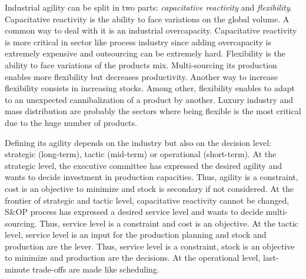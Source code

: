 Industrial agility can be split in two parts: \emph{capacitative reactivity} and \emph{flexibility}.
Capacitative reactivity is the ability to face variations on the global volume.
A common way to deal with it is an industrial overcapacity.
Capacitative reactivity is more critical in sector like process industry since adding overcapacity is extremely expensive and outsourcing can be extremely hard.
Flexibility is the ability to face variations of the products mix.
Multi-sourcing its production  enables more flexibility but decreases productivity.
Another way to increase flexibility consists in increasing stocks.
Among other, flexibility enables to adapt to an unexpected cannibalization of a product by another.
Luxury industry and mass distribution are probably the sectors where being flexible is the most critical due to the huge number of products.


Defining its agility depends on the industry but also on the decision level: strategic (long-term), tactic (mid-term) or operational (short-term).
At the strategic level, the executive committee has expressed the desired agility and wants to decide investment in production capacities.
Thus, agility is a constraint, cost is an objective to minimize and stock is secondary if not considered.
At the frontier of strategic and tactic level, capacitative reactivity cannot be changed, S\&OP process has expressed a desired service level and wants to decide multi-sourcing.
Thus, service level is a constraint and cost is an objective.
At the tactic level, service level is an input for the production planning and stock and production are the lever.
Thus, service level is a constraint, stock is an objective to minimize and production are the decisions.
At the operational level, last-minute trade-offs are made like scheduling.





